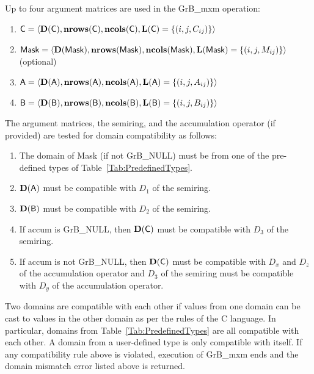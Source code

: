 Up to four argument matrices are used in the {\sf GrB\_mxm} operation:
\begin{enumerate}
	\item ${\sf C} = \langle \bold{D}({\sf C}),\bold{nrows}({\sf C}),\bold{ncols}({\sf C}),\bold{L}({\sf C}) = \{(i,j,C_{ij}) \} \rangle$
	\item ${\sf Mask} = \langle \bold{D}({\sf Mask}),\bold{nrows}({\sf Mask}),\bold{ncols}({\sf Mask}),\bold{L}({\sf Mask}) = \{(i,j,M_{ij}) \} \rangle$ (optional)
	\item ${\sf A} = \langle \bold{D}({\sf A}),\bold{nrows}({\sf A}), \bold{ncols}({\sf A}),\bold{L}({\sf A}) = \{(i,j,A_{ij}) \} \rangle$
	\item ${\sf B} = \langle \bold{D}({\sf B}),\bold{nrows}({\sf B}), \bold{ncols}({\sf B}),\bold{L}({\sf B}) = \{(i,j,B_{ij}) \} \rangle$
\end{enumerate}

The argument matrices, the semiring, and the accumulation operator (if provided) are tested for domain compatibility
as follows:
\begin{enumerate}
	\item The domain of {\sf Mask} (if not {\sf GrB\_NULL}) must be from one of the pre-defined types of Table~\ref{Tab:PredefinedTypes}.

	\item $\bold{D}({\sf A})$ must be compatible with $D_1$ of the semiring.

	\item $\bold{D}({\sf B})$ must be compatible with $D_2$ of the semiring.

	\item If {\sf accum} is {\sf GrB\_NULL}, then $\bold{D}({\sf C})$ must be compatible with $D_3$ of the semiring.

	\item If {\sf accum} is not {\sf GrB\_NULL}, then $\bold{D}({\sf C})$ must be compatible with $D_x$ and $D_z$ of the 
	accumulation operator and $D_3$ of the semiring must be compatible with $D_y$ of the accumulation operator.
\end{enumerate}
Two domains are compatible with each other if values from one domain can be cast to values in the other domain as per the rules of the C language.
In particular, domains from Table~\ref{Tab:PredefinedTypes} are all compatible with each other. A domain from a user-defined type is only compatible with itself.
If any compatibility rule above is violated, execution of {\sf GrB\_mxm} ends and the domain mismatch error listed above is returned.

